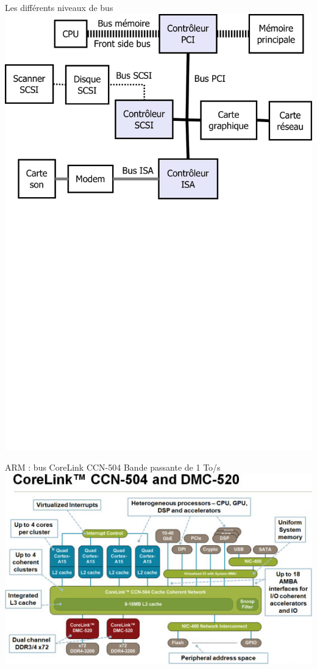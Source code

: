 \begin{frame}{Les différents niveaux de bus}
\includegraphics[width=\textwidth]{../illustration/NiveauxBus.pdf}
\end{frame}


\begin{frame}{ARM : bus CoreLink CCN-504}
Bande passante de 1 To/s \cite{xbits}
\includegraphics[width=\textwidth]{../illustration/arm504.jpg}
\end{frame}

